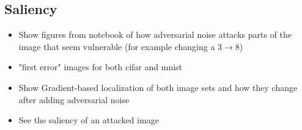 \pagebreak
    
\subsection{Saliency}
\begin{itemize}
    \item Show figures from notebook of how adversarial noise attacks parts of the image that seem vulnerable (for example changing a 3$\to$8)
    \item "first error" images for both cifar and mnist
    \item Show Gradient-based localization of both image sets and how they change after adding adversarial noise\cite{Selvaraju_2019}
    \item See the saliency of an attacked image
\end{itemize}
